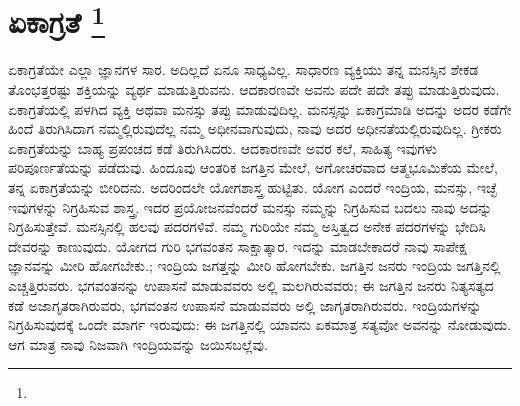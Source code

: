 
\vskip -0.5cm

\chapter[ಏಕಾಗ್ರತೆ ]{ಏಕಾಗ್ರತೆ \protect\footnote{}}

ಏಕಾಗ್ರತೆಯೇ ಎಲ್ಲಾ ಜ್ಞಾನಗಳ ಸಾರ. ಅದಿಲ್ಲದೆ ಏನೂ ಸಾಧ್ಯವಿಲ್ಲ. ಸಾಧಾರಣ ವ್ಯಕ್ತಿಯು ತನ್ನ ಮನಸ್ಸಿನ ಶೇಕಡ ತೊಂಭತ್ತರಷ್ಟು ಶಕ್ತಿಯನ್ನು ವ್ಯರ್ಥ ಮಾಡುತ್ತಿರುವನು. ಆದ\-ಕಾರಣವೇ ಅವನು ಪದೇ ಪದೇ ತಪ್ಪು ಮಾಡುತ್ತಿರುವುದು. ಏಕಾಗ್ರತೆಯಲ್ಲಿ ಪಳಗಿದ ವ್ಯಕ್ತಿ ಅಥವಾ ಮನಸ್ಸು ತಪ್ಪು ಮಾಡುವುದಿಲ್ಲ. ಮನಸ್ಸನ್ನು ಏಕಾಗ್ರಮಾಡಿ ಅದನ್ನು ಅದರ ಕಡೆಗೇ ಹಿಂದೆ ತಿರುಗಿಸಿದಾಗ ನಮ್ಮಲ್ಲಿರುವುದೆಲ್ಲ ನಮ್ಮ ಅಧೀನವಾಗುವುದು, ನಾವು ಅದರ ಅಧೀನತೆಯಲ್ಲಿರುವುದಿಲ್ಲ. ಗ್ರೀಕರು ಏಕಾಗ್ರತೆಯನ್ನು ಬಾಹ್ಯ ಪ್ರಪಂಚದ ಕಡೆ ತಿರುಗಿಸಿದರು. ಆದಕಾರಣವೇ ಅವರ ಕಲೆ, ಸಾಹಿತ್ಯ ಇವುಗಳು ಪರಿಪೂರ್ಣತೆಯನ್ನು ಪಡೆದುವು. ಹಿಂದೂವು ಆಂತರಿಕ ಜಗತ್ತಿನ ಮೇಲೆ, ಅಗೋಚರವಾದ ಆತ್ಮಭೂಮಿಕೆಯ ಮೇಲೆ, ತನ್ನ ಏಕಾಗ್ರತೆಯನ್ನು ಬೀರಿದನು. ಅದರಿಂದಲೇ ಯೋಗಶಾಸ್ತ್ರ ಹುಟ್ಟಿತು. ಯೋಗ ಎಂದರೆ ಇಂದ್ರಿಯ, ಮನಸ್ಸು, ಇಚ್ಛೆ ಇವುಗಳನ್ನು ನಿಗ್ರಹಿಸುವ ಶಾಸ್ತ್ರ. ಇದರ ಪ್ರಯೋಜನವೆಂದರೆ ಮನಸ್ಸು ನಮ್ಮನ್ನು ನಿಗ್ರಹಿಸುವ ಬದಲು ನಾವು ಅದನ್ನು ನಿಗ್ರಹಿಸುತ್ತೇವೆ. ಮನಸ್ಸಿನಲ್ಲಿ ಹಲವು ಪದರಗಳಿವೆ. ನಮ್ಮ ಗುರಿಯೇ ನಮ್ಮ ಅಸ್ತಿತ್ವದ ಅನೇಕ ಪದರಗಳನ್ನು ಭೇದಿಸಿ ದೇವರನ್ನು ಕಾಣುವುದು. ಯೋಗದ ಗುರಿ ಭಗವಂತನ ಸಾಕ್ಷಾತ್ಕಾರ. ಇದನ್ನು ಮಾಡಬೇಕಾದರೆ ನಾವು ಸಾಪೇಕ್ಷ ಜ್ಞಾನವನ್ನು ಮೀರಿ ಹೋಗಬೇಕು.; ಇಂದ್ರಿಯ ಜಗತ್ತನ್ನು ಮೀರಿ ಹೋಗಬೇಕು. ಜಗತ್ತಿನ ಜನರು ಇಂದ್ರಿಯ ಜಗತ್ತಿನಲ್ಲಿ ಎಚ್ಚತ್ತಿರುವರು. ಭಗವಂತನನ್ನು ಉಪಾಸನೆ ಮಾಡುವವರು ಅಲ್ಲಿ ಮಲಗಿರುವವರು; ಈ ಜಗತ್ತಿನ ಜನರು ನಿತ್ಯಸತ್ಯದ ಕಡೆ ಅಜಾಗೃತರಾಗಿರುವರು, ಭಗವಂತನ ಉಪಾಸನೆ ಮಾಡುವವರು ಅಲ್ಲಿ ಜಾಗೃತರಾಗಿರುವರು. ಇಂದ್ರಿಯಗಳನ್ನು ನಿಗ್ರಹಿಸುವುದಕ್ಕೆ ಒಂದೇ ಮಾರ್ಗ ಇರುವುದು: ಈ ಜಗತ್ತಿನಲ್ಲಿ ಯಾವನು ಏಕಮಾತ್ರ ಸತ್ಯವೋ ಅವನನ್ನು ನೋಡುವುದು. ಆಗ ಮಾತ್ರ ನಾವು ನಿಜವಾಗಿ ಇಂದ್ರಿಯವನ್ನು ಜಯಿಸಬಲ್ಲೆವು.

\eject

